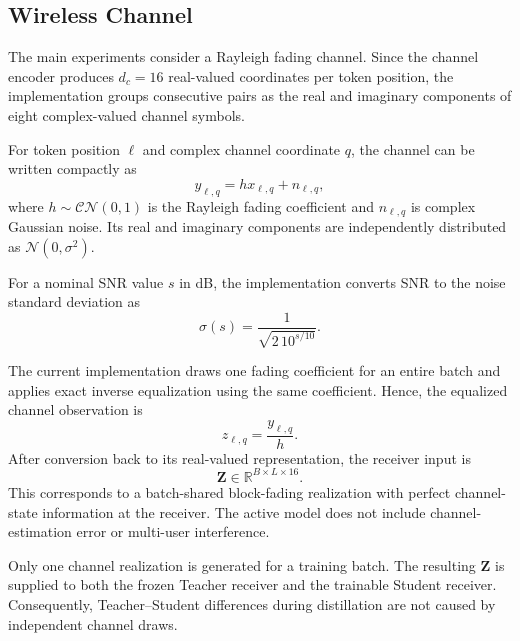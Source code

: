 \documentclass[conference]{IEEEtran}
\begin{document}
\subsection{Wireless Channel}
The main experiments consider a Rayleigh fading channel. Since the channel encoder produces $d_c=16$ real-valued coordinates per token position, the implementation groups consecutive pairs as the real and imaginary components of eight complex-valued channel symbols.

For token position $\ell$ and complex channel coordinate $q$, the channel can be written compactly as
\begin{equation}
    y_{\ell,q}=h x_{\ell,q}+n_{\ell,q},
\label{eq:rayleigh-channel}
\end{equation}
where $h\sim\mathcal{CN}(0,1)$ is the Rayleigh fading coefficient and $n_{\ell,q}$ is complex Gaussian noise. Its real and imaginary components are independently distributed as $\mathcal{N}(0,\sigma^2)$.

For a nominal SNR value $s$ in dB, the implementation converts SNR to the noise standard deviation as
\begin{equation}
    \sigma(s)
    =
    \frac{1}{\sqrt{2\,10^{s/10}}}.
\label{eq:snr}
\end{equation}

The current implementation draws one fading coefficient for an entire batch and applies exact inverse equalization using the same coefficient. Hence, the equalized channel observation is
\begin{equation}
    z_{\ell,q}=\frac{y_{\ell,q}}{h}.
\label{eq:equalization}
\end{equation}
After conversion back to its real-valued representation, the receiver input is
\begin{equation}
    \mathbf{Z}\in\mathbb{R}^{B\times L\times16}.
\end{equation}
This corresponds to a batch-shared block-fading realization with perfect channel-state information at the receiver. The active model does not include channel-estimation error or multi-user interference.

Only one channel realization is generated for a training batch. The resulting $\mathbf{Z}$ is supplied to both the frozen Teacher receiver and the trainable Student receiver. Consequently, Teacher--Student differences during distillation are not caused by independent channel draws.
\end{document}
